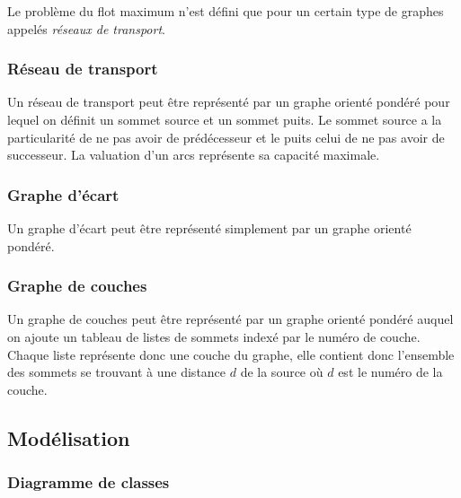 Le problème du flot maximum n'est défini que pour un certain type de graphes appelés \emph{réseaux de transport}.

\subsubsection{Réseau de transport}
Un réseau de transport peut être représenté par un graphe orienté pondéré pour lequel on définit un sommet source et un sommet puits. Le sommet source a la particularité de ne pas avoir de prédécesseur et le puits celui de ne pas avoir de successeur. La valuation d'un arcs représente sa capacité maximale.

\subsubsection{Graphe d'écart}
Un graphe d'écart peut être représenté simplement par un graphe orienté pondéré.

\subsubsection{Graphe de couches}
Un graphe de couches peut être représenté par un graphe orienté pondéré auquel on ajoute un tableau de listes de sommets indexé par le numéro de couche. Chaque liste représente donc une couche du graphe, elle contient donc l'ensemble des sommets se trouvant à une distance $d$ de la source où $d$ est le numéro de la couche.


\subsection{Modélisation}

\subsubsection{Diagramme de classes}

